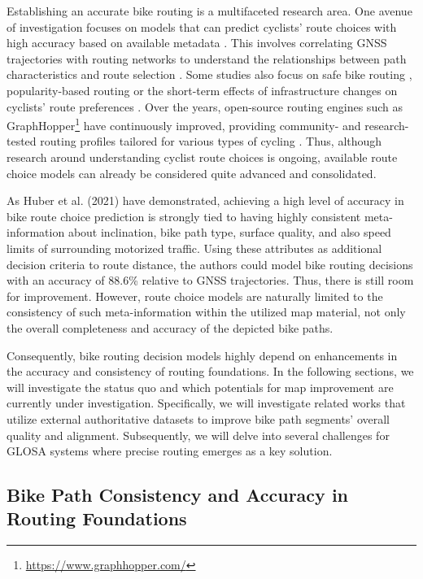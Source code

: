 Establishing an accurate bike routing is a multifaceted research area. One avenue of investigation focuses on models that can predict cyclists' route choices with high accuracy based on available metadata \cite{dill_understanding_2008, ghanayim_modelling_2018, huber_modelling_2021}. This involves correlating GNSS trajectories with routing networks to understand the relationships between path characteristics and route selection \cite{sultan_extracting_2017, huber_modelling_2021}. Some studies also focus on safe bike routing \cite{loidl_online_2018}, popularity-based routing \cite{bergman_conflation_2016} or the short-term effects of infrastructure changes on cyclists' route preferences \cite{yeboah_route_2015, pritchard_does_2019}. Over the years, open-source routing engines such as GraphHopper\footnote{\url{https://www.graphhopper.com/}} have continuously improved, providing community- and research-tested routing profiles tailored for various types of cycling \cite{krismer_elevation_2016}. Thus, although research around understanding cyclist route choices is ongoing, available route choice models can already be considered quite advanced and consolidated.

As Huber et al. (2021) \cite{huber_modelling_2021} have demonstrated, achieving a high level of accuracy in bike route choice prediction is strongly tied to having highly consistent meta-information about inclination, bike path type, surface quality, and also speed limits of surrounding motorized traffic. Using these attributes as additional decision criteria to route distance, the authors could model bike routing decisions with an accuracy of 88.6\% relative to GNSS trajectories. Thus, there is still room for improvement. However, route choice models are naturally limited to the consistency of such meta-information within the utilized map material, not only the overall completeness and accuracy of the depicted bike paths.

Consequently, bike routing decision models highly depend on enhancements in the accuracy and consistency of routing foundations. In the following sections, we will investigate the status quo and which potentials for map improvement are currently under investigation. Specifically, we will investigate related works that utilize external authoritative datasets to improve bike path segments' overall quality and alignment. Subsequently, we will delve into several challenges for GLOSA systems where precise routing emerges as a key solution.

\subsection{Bike Path Consistency and Accuracy in Routing Foundations}

